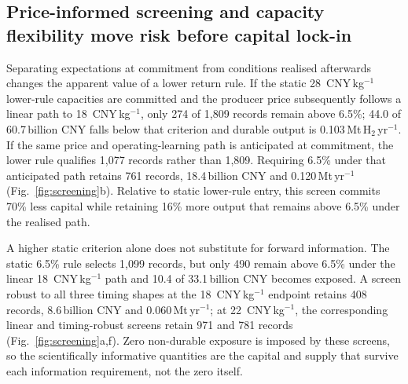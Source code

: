 \documentclass[11pt,a4paper]{article}
\newcommand{\cnykg}{CNY\,kg$^{-1}$}
\begin{document}
\subsection*{Price-informed screening and capacity flexibility move risk before capital lock-in}

Separating expectations at commitment from conditions realised afterwards changes the apparent value of a lower return rule. If the static 28~\cnykg{} lower-rule capacities are committed and the producer price subsequently follows a linear path to 18~\cnykg{}, only 274 of 1,809 records remain above 6.5\%; 44.0 of 60.7\,billion CNY falls below that criterion and durable output is 0.103\,Mt\,H$_2$\,yr$^{-1}$. If the same price and operating-learning path is anticipated at commitment, the lower rule qualifies 1,077 records rather than 1,809. Requiring 6.5\% under that anticipated path retains 761 records, 18.4\,billion CNY and 0.120\,Mt\,yr$^{-1}$ (Fig.~\ref{fig:screening}b). Relative to static lower-rule entry, this screen commits 70\% less capital while retaining 16\% more output that remains above 6.5\% under the realised path.

A higher static criterion alone does not substitute for forward information. The static 6.5\% rule selects 1,099 records, but only 490 remain above 6.5\% under the linear 18~\cnykg{} path and 10.4 of 33.1\,billion CNY becomes exposed. A screen robust to all three timing shapes at the 18~\cnykg{} endpoint retains 408 records, 8.6\,billion CNY and 0.060\,Mt\,yr$^{-1}$; at 22~\cnykg{}, the corresponding linear and timing-robust screens retain 971 and 781 records (Fig.~\ref{fig:screening}a,f). Zero non-durable exposure is imposed by these screens, so the scientifically informative quantities are the capital and supply that survive each information requirement, not the zero itself.
\end{document}
